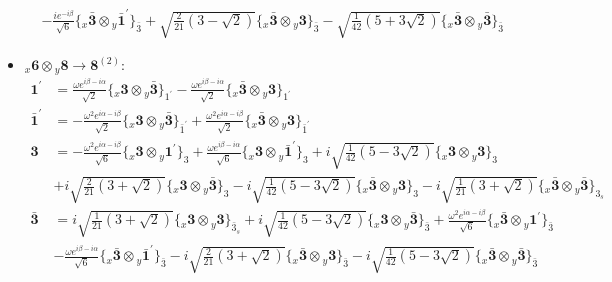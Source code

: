 \documentclass[english]{article}
\newcommand{\rep}[1]{\mathbf{#1}}
\newcommand{\repx}[2]{{}_{#2}\mathbf{#1}}
\newcommand{\subcg}[3]{\big\{ \repx{#1}{x}\otimes\repx{#2}{y}\big\}^{}_{#3}}
\begin{document}
\begin{itemize}
\begin{align*}
 & -\frac{i e^{-i \beta }}{\sqrt{6}}\subcg{\bar{3}}{\bar{1}^{\prime}}{\bar{3}}+\sqrt{\frac{2}{21} \left(3-\sqrt{2}\right)}\subcg{\bar{3}}{3}{\bar{3}}-\sqrt{\frac{1}{42} \left(5+3 \sqrt{2}\right)}\subcg{\bar{3}}{\bar{3}}{\bar{3}}
\end{align*}
\item $\repx{6}{x}\otimes\repx{8}{y}\to\rep{8}^{(2)}$:
\begin{align*}
\rep{1^{\prime}} & = \frac{\omega  e^{i \beta -i \alpha }}{\sqrt{2}}\subcg{3}{\bar{3}}{1^{\prime}}-\frac{\omega  e^{i \beta -i \alpha }}{\sqrt{2}}\subcg{\bar{3}}{3}{1^{\prime}}
\\
\rep{\bar{1}^{\prime}} & = -\frac{\omega ^2 e^{i \alpha -i \beta }}{\sqrt{2}}\subcg{3}{\bar{3}}{\bar{1}^{\prime}}+\frac{\omega ^2 e^{i \alpha -i \beta }}{\sqrt{2}}\subcg{\bar{3}}{3}{\bar{1}^{\prime}}
\\
\rep{3} & = -\frac{\omega ^2 e^{i \alpha -i \beta }}{\sqrt{6}}\subcg{3}{1^{\prime}}{3}+\frac{\omega  e^{i \beta -i \alpha }}{\sqrt{6}}\subcg{3}{\bar{1}^{\prime}}{3}+i \sqrt{\frac{1}{42} \left(5-3 \sqrt{2}\right)}\subcg{3}{3}{3} \\ 
 & +i \sqrt{\frac{2}{21} \left(3+\sqrt{2}\right)}\subcg{3}{\bar{3}}{3}-i \sqrt{\frac{1}{42} \left(5-3 \sqrt{2}\right)}\subcg{\bar{3}}{3}{3}-i \sqrt{\frac{1}{21} \left(3+\sqrt{2}\right)}\subcg{\bar{3}}{\bar{3}}{3_{s}}
\\
\rep{\bar{3}} & = i \sqrt{\frac{1}{21} \left(3+\sqrt{2}\right)}\subcg{3}{3}{\bar{3}_{s}}+i \sqrt{\frac{1}{42} \left(5-3 \sqrt{2}\right)}\subcg{3}{\bar{3}}{\bar{3}}+\frac{\omega ^2 e^{i \alpha -i \beta }}{\sqrt{6}}\subcg{\bar{3}}{1^{\prime}}{\bar{3}} \\ 
 & -\frac{\omega  e^{i \beta -i \alpha }}{\sqrt{6}}\subcg{\bar{3}}{\bar{1}^{\prime}}{\bar{3}}-i \sqrt{\frac{2}{21} \left(3+\sqrt{2}\right)}\subcg{\bar{3}}{3}{\bar{3}}-i \sqrt{\frac{1}{42} \left(5-3 \sqrt{2}\right)}\subcg{\bar{3}}{\bar{3}}{\bar{3}}
\end{align*}
\end{itemize}
\end{document}
